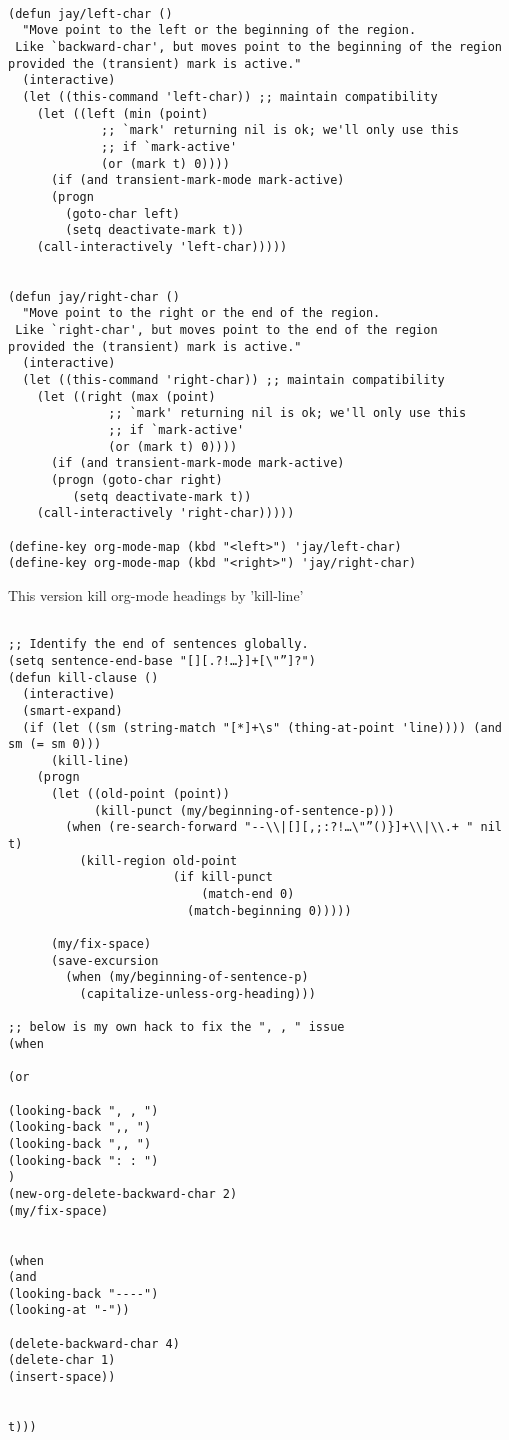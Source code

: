 \documentclass[11pt]{article}
\begin{document}
\begin{verbatim}

(defun jay/left-char ()
  "Move point to the left or the beginning of the region.
 Like `backward-char', but moves point to the beginning of the region
provided the (transient) mark is active."
  (interactive)
  (let ((this-command 'left-char)) ;; maintain compatibility
    (let ((left (min (point)
		     ;; `mark' returning nil is ok; we'll only use this
		     ;; if `mark-active'
		     (or (mark t) 0))))
      (if (and transient-mark-mode mark-active)
	  (progn
	    (goto-char left)
	    (setq deactivate-mark t))
	(call-interactively 'left-char)))))


(defun jay/right-char ()
  "Move point to the right or the end of the region.
 Like `right-char', but moves point to the end of the region
provided the (transient) mark is active."
  (interactive)
  (let ((this-command 'right-char)) ;; maintain compatibility
    (let ((right (max (point)
		      ;; `mark' returning nil is ok; we'll only use this
		      ;; if `mark-active'
		      (or (mark t) 0))))
      (if (and transient-mark-mode mark-active)
	  (progn (goto-char right)
		 (setq deactivate-mark t))
	(call-interactively 'right-char)))))

(define-key org-mode-map (kbd "<left>") 'jay/left-char)
(define-key org-mode-map (kbd "<right>") 'jay/right-char)

\end{verbatim}
\label{sec:org99e6d0a}

This version kill org-mode headings by 'kill-line'
\begin{verbatim}

;; Identify the end of sentences globally.
(setq sentence-end-base "[][.?!…}]+[\"”]?")
(defun kill-clause ()
  (interactive)
  (smart-expand)
  (if (let ((sm (string-match "[*]+\s" (thing-at-point 'line)))) (and sm (= sm 0)))
      (kill-line)
    (progn
      (let ((old-point (point))
            (kill-punct (my/beginning-of-sentence-p)))
        (when (re-search-forward "--\\|[][,;:?!…\"”()}]+\\|\\.+ " nil t)
          (kill-region old-point
                       (if kill-punct
                           (match-end 0)
                         (match-beginning 0)))))

      (my/fix-space)
      (save-excursion
        (when (my/beginning-of-sentence-p)
          (capitalize-unless-org-heading)))

;; below is my own hack to fix the ", , " issue
(when

(or

(looking-back ", , ")
(looking-back ",, ")
(looking-back ",, ")
(looking-back ": : ")
)
(new-org-delete-backward-char 2) 
(my/fix-space)


(when
(and
(looking-back "----")
(looking-at "-"))

(delete-backward-char 4)
(delete-char 1)
(insert-space))


t)))

\end{verbatim}
\end{document}
